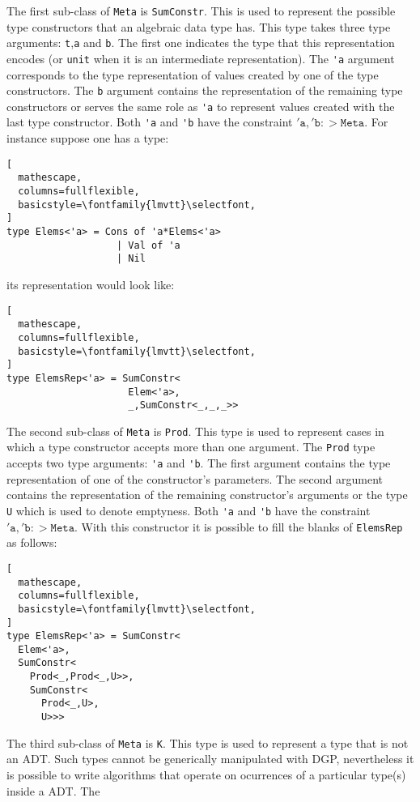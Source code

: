 \documentclass{sigplanconf}
\begin{document}
The first sub-class of \verb+Meta+ is \verb+SumConstr+. This is used
to represent the possible type constructors that an algebraic data
type has. This type takes three type arguments: \verb+t+,\verb+a+ and
\verb+b+. The first one indicates the type that this representation
encodes (or \verb+unit+ when it is an intermediate
representation). The \verb+'a+ argument corresponds to the type
representation of values created by one of the type constructors. The
\verb+b+ argument contains the representation of the remaining type
constructors or serves the same role as \verb+'a+ to represent values
created with the last type constructor. Both \verb+'a+ and \verb+'b+
have the constraint $\mathtt{'a},\mathtt{'b} :> \mathtt{Meta}$. For
instance suppose one has a type:
\begin{lstlisting}[
  mathescape,
  columns=fullflexible,
  basicstyle=\fontfamily{lmvtt}\selectfont,
]
type Elems<'a> = Cons of 'a*Elems<'a> 
                   | Val of 'a 
                   | Nil 
\end{lstlisting}
its representation would look like:
\begin{lstlisting}[
  mathescape,
  columns=fullflexible,
  basicstyle=\fontfamily{lmvtt}\selectfont,
]
type ElemsRep<'a> = SumConstr<
                     Elem<'a>,
                     _,SumConstr<_,_,_>>
\end{lstlisting}
The second sub-class of \verb+Meta+ is \verb+Prod+. This type is used
to represent cases in which a type constructor accepts more than one
argument. The \verb+Prod+ type accepts two type arguments: \verb+'a+
and \verb+'b+. The first argument contains the type representation of
one of the constructor's parameters. The second argument contains the
representation of the remaining constructor's arguments or the type
\verb+U+ which is used to denote emptyness. Both \verb+'a+ and
\verb+'b+ have the constraint $\mathtt{'a},\mathtt{'b} :>
\mathtt{Meta}$. With this constructor it is possible to fill the
blanks of \verb+ElemsRep+ as follows:
\begin{lstlisting}[
  mathescape,
  columns=fullflexible,
  basicstyle=\fontfamily{lmvtt}\selectfont,
]
type ElemsRep<'a> = SumConstr<
  Elem<'a>,
  SumConstr<
    Prod<_,Prod<_,U>>,
    SumConstr<
      Prod<_,U>,
      U>>>
\end{lstlisting}
The third sub-class of \verb+Meta+ is \verb+K+. This type is used to
represent a type that is not an ADT. Such types cannot be generically
manipulated with DGP, nevertheless it is possible to write algorithms
that operate on ocurrences of a particular type(s) inside a ADT. The
\end{document}
